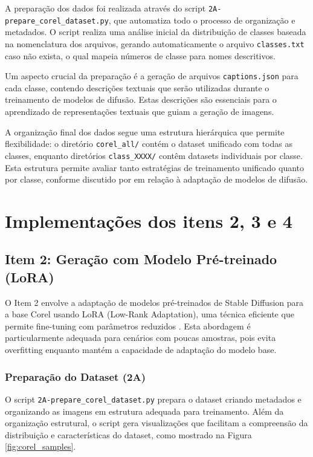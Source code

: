 A preparação dos dados foi realizada através do script \texttt{2A-prepare\_corel\_dataset.py}, que automatiza todo o processo de organização e metadados. O script realiza uma análise inicial da distribuição de classes baseada na nomenclatura dos arquivos, gerando automaticamente o arquivo \texttt{classes.txt} caso não exista, o qual mapeia números de classe para nomes descritivos.

Um aspecto crucial da preparação é a geração de arquivos \texttt{captions.json} para cada classe, contendo descrições textuais que serão utilizadas durante o treinamento de modelos de difusão. Estas descrições são essenciais para o aprendizado de representações textuais que guiam a geração de imagens.

A organização final dos dados segue uma estrutura hierárquica que permite flexibilidade: o diretório \texttt{corel\_all/} contém o dataset unificado com todas as classes, enquanto diretórios \texttt{class\_XXXX/} contêm datasets individuais por classe. Esta estrutura permite avaliar tanto estratégias de treinamento unificado quanto por classe, conforme discutido por \cite{rombach2022high} em relação à adaptação de modelos de difusão.

\section{Implementações dos itens 2, 3 e 4}

\subsection{Item 2: Geração com Modelo Pré-treinado (LoRA)}

O Item 2 envolve a adaptação de modelos pré-treinados de Stable Diffusion para a base Corel usando LoRA (Low-Rank Adaptation), uma técnica eficiente que permite fine-tuning com parâmetros reduzidos \cite{hu2021lora}. Esta abordagem é particularmente adequada para cenários com poucas amostras, pois evita overfitting enquanto mantém a capacidade de adaptação do modelo base.

\subsubsection{Preparação do Dataset (2A)}

O script \texttt{2A-prepare\_corel\_dataset.py} prepara o dataset criando metadados e organizando as imagens em estrutura adequada para treinamento. Além da organização estrutural, o script gera visualizações que facilitam a compreensão da distribuição e características do dataset, como mostrado na Figura \ref{fig:corel_samples}.

